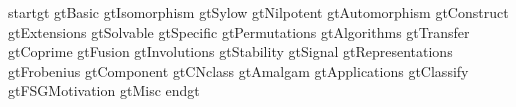  {startgt}
 {gtBasic}
 {gtIsomorphism}
 {gtSylow}
 {gtNilpotent}
 {gtAutomorphism}
 {gtConstruct}
 {gtExtensions}
 {gtSolvable}
 {gtSpecific}
 {gtPermutations}
 {gtAlgorithms}
 {gtTransfer}
 {gtCoprime}
 {gtFusion}
 {gtInvolutions}
 {gtStability}
 {gtSignal}
 {gtRepresentations}
 {gtFrobenius}
 {gtComponent}
 {gtCNclass}
 {gtAmalgam}
 {gtApplications}
 {gtClassify}
 {gtFSGMotivation}
 {gtMisc}
 {endgt}

